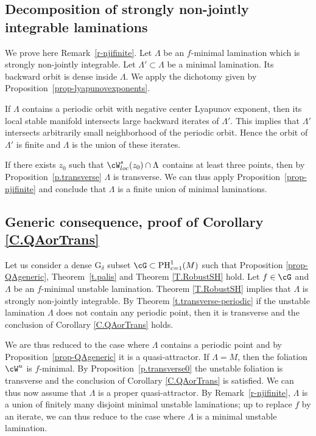 \documentclass[a4paper,11pt]{amsart}
\numberwithin{equation}{section}     %
\theoremstyle{definition}
\theoremstyle{remark}
\DeclareMathOperator{\PH}{PH}
\begin{document}
\subsection{Decomposition of strongly non-jointly integrable laminations}\label{s-njifinite}
We prove here Remark~\ref{r-njifinite}. Let $\Lambda$ be an $f$-minimal lamination which is strongly non-jointly integrable.
Let $\Lambda'\subset \Lambda$ be a minimal lamination. Its backward orbit is dense inside $\Lambda$.
We apply the dichotomy given by Proposition~\ref{prop-lyapunovexponents}.

If $\Lambda$ contains a periodic orbit with negative center Lyapunov exponent, then its local stable manifold intersects large backward iterates of $\Lambda'$. This implies that $\Lambda'$ intersects arbitrarily small neighborhood of the periodic orbit.
Hence the orbit of $\Lambda'$ is finite and $\Lambda$ is the union of these iterates.

If there exists $z_0$ such that $\cW^s_{loc}(z_0)\cap \Lambda$ contains at least three points, then by Proposition~\ref{p.transverse} $\Lambda$ is transverse. We can thus apply Proposition~\ref{prop-njifinite} and conclude that $\Lambda$ is a finite union of minimal laminations.

\subsection{Generic consequence, proof of Corollary \ref{C.QAorTrans}} 
Let us consider a dense G$_\delta$ subset $\cG \subset \PH^1_{c=1}(M)$ such that Proposition \ref{prop-QAgeneric}, Theorem~\ref{t.palis} and Theorem \ref{T.RobustSH} hold.
Let $f \in \cG$ and $\Lambda$ be an $f$-minimal unstable lamination.
Theorem \ref{T.RobustSH} implies that $\Lambda$ is strongly non-jointly integrable.
By Theorem \ref{t.transverse-periodic} if the unstable lamination $\Lambda$ does not contain any periodic point, then it is transverse and the conclusion of Corollary \ref{C.QAorTrans} holds.

We are thus reduced to the case where $\Lambda$ contains a periodic point and by Proposition~\ref{prop-QAgeneric} it is a quasi-attractor. If $\Lambda=M$, then the foliation $\cW^u$ is $f$-minimal. By Proposition~\ref{p.transverse0} the unstable foliation is transverse and the conclusion of Corollary \ref{C.QAorTrans} is satisfied. We can thus now assume that $\Lambda$ is a proper quasi-attractor. By Remark~\ref{r-njifinite}, $\Lambda$ is a union of finitely many disjoint minimal unstable laminations; up to replace $f$ by an iterate, we can thus reduce to the case where $\Lambda$ is a minimal unstable lamination.
\end{document}
